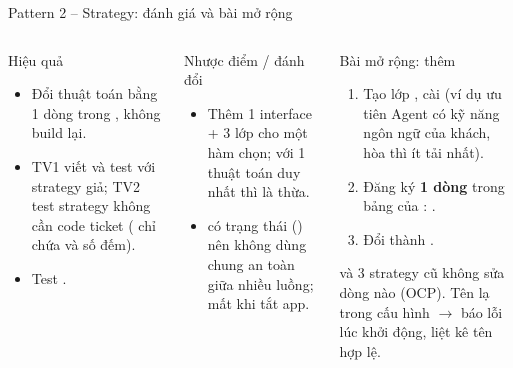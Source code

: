 \begin{frame}{Pattern 2 -- Strategy: đánh giá và bài mở rộng}
\begin{columns}[T]
\begin{block}{Hiệu quả}
\scriptsize
\begin{itemize}
  \item Đổi thuật toán bằng 1 dòng trong , không build lại.
  \item TV1 viết và test  với strategy giả; TV2 test strategy không cần code ticket ( chỉ chứa  và số đếm).
  \item Test .
\end{itemize}
\end{block}
\begin{block}{Nhược điểm / đánh đổi}
\scriptsize
\begin{itemize}
  \item Thêm 1 interface + 3 lớp cho một hàm chọn; với 1 thuật toán duy nhất thì là thừa.
  \item {} có trạng thái () nên không dùng chung an toàn giữa nhiều luồng; mất khi tắt app.
\end{itemize}
\end{block}
\begin{block}{Bài mở rộng: thêm }
\scriptsize
\begin{enumerate}
  \item Tạo lớp , cài  (ví dụ ưu tiên Agent có kỹ năng ngôn ngữ của khách, hòa thì ít tải nhất).
  \item Đăng ký \textbf{1 dòng} trong bảng của : .
  \item Đổi  thành .
\end{enumerate}
 và 3 strategy cũ không sửa dòng nào (OCP). Tên lạ trong cấu hình $\to$ báo lỗi lúc khởi động, liệt kê tên hợp lệ.
\end{block}
\end{columns}
\end{frame}
